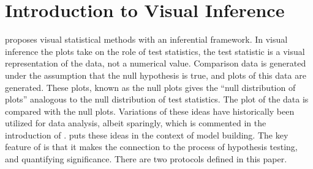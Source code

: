 


\section{Introduction to Visual Inference} 

\citet{buja:2009} proposes visual statistical methods with an inferential framework. In visual inference the plots take on the role of test statistics, the test statistic is a visual representation of the data, not a numerical value. Comparison data is generated under the assumption that the null hypothesis is true, and plots of this data are generated. These plots, known as the null plots gives the ``null distribution of plots'' analogous to the null distribution of test statistics. The plot of the data is compared with the null plots. Variations of these ideas have historically been utilized for data analysis, albeit sparingly, which is commented in the introduction of \cite{buja:2009}. \cite{gelman:2004} puts these ideas in the context of model building. The key feature of \cite{buja:2009} is that it makes the connection to the process of hypothesis testing, and quantifying significance. There are two protocols defined in this paper.


